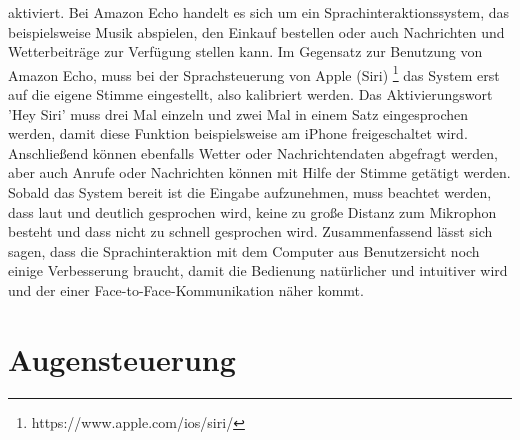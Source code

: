 %
aktiviert. Bei Amazon Echo handelt es sich um ein Sprachinteraktionssystem, das beispielsweise Musik abspielen, den Einkauf bestellen oder auch Nachrichten und Wetterbeiträge zur Verfügung stellen kann.
Im Gegensatz zur Benutzung von Amazon Echo, muss bei der Sprachsteuerung von Apple (Siri)%
\footnote{https://www.apple.com/ios/siri/}
%
 das System erst auf die eigene Stimme eingestellt, also kalibriert werden. Das Aktivierungswort 'Hey Siri' muss drei Mal einzeln und zwei Mal in einem Satz eingesprochen werden, damit diese Funktion beispielsweise am iPhone freigeschaltet wird. Anschließend können ebenfalls Wetter oder Nachrichtendaten abgefragt werden, aber auch Anrufe oder Nachrichten können mit Hilfe der Stimme getätigt werden. 
\newline \newline
Sobald das System bereit ist die Eingabe aufzunehmen, muss beachtet werden, dass laut und deutlich gesprochen wird, keine zu große Distanz zum Mikrophon besteht und dass nicht zu schnell gesprochen wird.
\newline \newline
Zusammenfassend lässt sich sagen, dass die Sprachinteraktion mit dem Computer aus Benutzersicht noch einige Verbesserung braucht, damit die Bedienung natürlicher und intuitiver wird und der einer Face-to-Face-Kommunikation näher kommt.

\section{Augensteuerung}
\label{cha:Augensteuerung}

